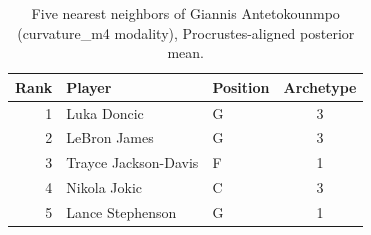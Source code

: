 \begin{table}[htbp]
  \centering\small
  \begin{tabular}{rllc}
    \toprule
    Rank & Player & Position & Archetype \\
    \midrule
    1 & Luka Doncic & G & 3 \\
    2 & LeBron James & G & 3 \\
    3 & Trayce Jackson-Davis & F & 1 \\
    4 & Nikola Jokic & C & 3 \\
    5 & Lance Stephenson & G & 1 \\
    \bottomrule
  \end{tabular}
  \caption{Five nearest neighbors of Giannis Antetokounmpo (curvature_m4 modality), Procrustes-aligned posterior mean.}
  \label{tab:Giannis_Antetokounmpo_neighbors_curvature_m4}
\end{table}

